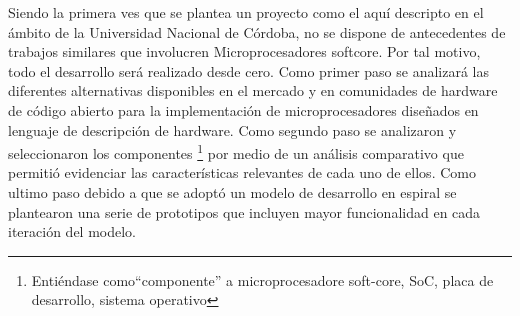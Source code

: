 Siendo la primera ves que se plantea un proyecto como el aquí
descripto en el ámbito de la Universidad Nacional de Córdoba, no se
dispone de antecedentes de trabajos similares que involucren
Microprocesadores softcore. Por tal motivo, todo el desarrollo será
realizado desde cero. Como primer paso se analizará las diferentes
alternativas disponibles en el mercado y en comunidades de hardware de
código abierto para la implementación de microprocesadores diseñados
en lenguaje de descripción de hardware. Como segundo paso 
se analizaron y seleccionaron los componentes \footnote{Entiéndase como``componente'' a 
microprocesadore soft-core, SoC, placa de desarrollo, sistema operativo} 
por medio de un análisis comparativo que permitió evidenciar las características relevantes de
cada uno de ellos. Como ultimo paso debido a que se adoptó un modelo de desarrollo en espiral 
se plantearon una serie de prototipos que incluyen mayor funcionalidad en cada iteración del modelo.


